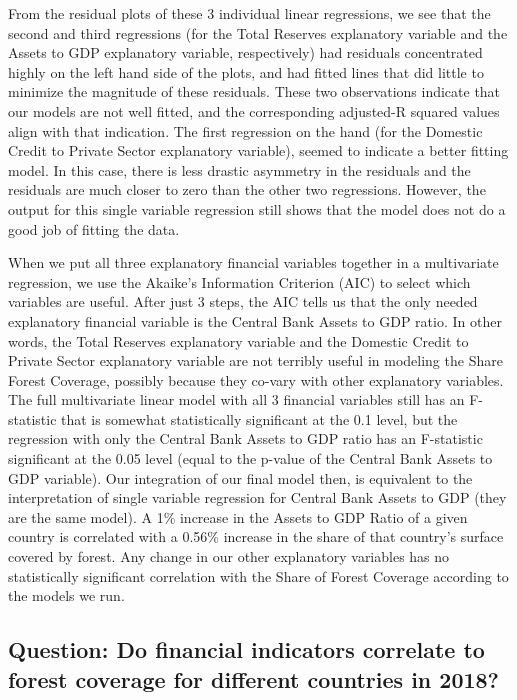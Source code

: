 \documentclass[
  12pt,
]{article}
\begin{document}
From the residual plots of these 3 individual linear regressions, we see
that the second and third regressions (for the Total Reserves
explanatory variable and the Assets to GDP explanatory variable,
respectively) had residuals concentrated highly on the left hand side of
the plots, and had fitted lines that did little to minimize the
magnitude of these residuals. These two observations indicate that our
models are not well fitted, and the corresponding adjusted-R squared
values align with that indication. The first regression on the hand (for
the Domestic Credit to Private Sector explanatory variable), seemed to
indicate a better fitting model. In this case, there is less drastic
asymmetry in the residuals and the residuals are much closer to zero
than the other two regressions. However, the output for this single
variable regression still shows that the model does not do a good job of
fitting the data.

When we put all three explanatory financial variables together in a
multivariate regression, we use the Akaike's Information Criterion (AIC)
to select which variables are useful. After just 3 steps, the AIC tells
us that the only needed explanatory financial variable is the Central
Bank Assets to GDP ratio. In other words, the Total Reserves explanatory
variable and the Domestic Credit to Private Sector explanatory variable
are not terribly useful in modeling the Share Forest Coverage, possibly
because they co-vary with other explanatory variables. The full
multivariate linear model with all 3 financial variables still has an
F-statistic that is somewhat statistically significant at the 0.1 level,
but the regression with only the Central Bank Assets to GDP ratio has an
F-statistic significant at the 0.05 level (equal to the p-value of the
Central Bank Assets to GDP variable). Our integration of our final model
then, is equivalent to the interpretation of single variable regression
for Central Bank Assets to GDP (they are the same model). A 1\% increase
in the Assets to GDP Ratio of a given country is correlated with a
0.56\% increase in the share of that country's surface covered by
forest. Any change in our other explanatory variables has no
statistically significant correlation with the Share of Forest Coverage
according to the models we run.

\hypertarget{question-do-financial-indicators-correlate-to-forest-coverage-for-different-countries-in-2018}{%
\subsection{Question: Do financial indicators correlate to forest
coverage for different countries in
2018?}\label{question-do-financial-indicators-correlate-to-forest-coverage-for-different-countries-in-2018}}
\end{document}
